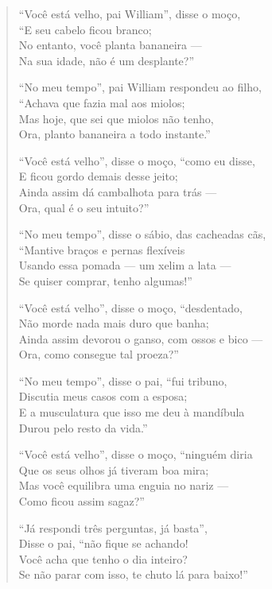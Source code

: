\begin{verse}
\footnotesize
``Você está velho, pai William'', disse o moço,\\
``E seu cabelo ficou branco;\\
No entanto, você planta bananeira ---\\
Na sua idade, não é um desplante?''

``No meu tempo'', pai William respondeu ao filho,\\
``Achava que fazia mal aos miolos;\\
Mas hoje, que sei que miolos não tenho,\\
Ora, planto bananeira a todo instante.''

``Você está velho'', disse o moço, ``como eu disse,\\
E ficou gordo demais desse jeito;\\
Ainda assim dá cambalhota para trás ---\\
Ora, qual é o seu intuito?''

``No meu tempo'', disse o sábio, das cacheadas cãs,\\
``Mantive braços e pernas flexíveis\\
Usando essa pomada --- um xelim a lata ---\\
Se quiser comprar, tenho algumas!''

``Você está velho'', disse o moço, ``desdentado,\\
Não morde nada mais duro que banha;\\
Ainda assim devorou o ganso, com ossos e bico ---\\
Ora, como consegue tal proeza?''

``No meu tempo'', disse o pai, ``fui tribuno,\\
Discutia meus casos com a esposa;\\
E a musculatura que isso me deu à mandíbula\\
Durou pelo resto da vida.''

``Você está velho'', disse o moço, ``ninguém diria\\
Que os seus olhos já tiveram boa mira;\\
Mas você equilibra uma enguia no nariz ---\\
Como ficou assim sagaz?''

``Já respondi três perguntas, já basta'',\\
Disse o pai, ``não fique se achando!\\
Você acha que tenho o dia inteiro?\\
Se não parar com isso, te chuto lá para baixo!''
\end{verse}

